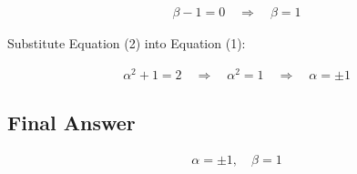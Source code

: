 \documentclass{article}
\begin{document}
\begin{align}
\beta - 1 = 0 \quad \Rightarrow \quad \beta = 1 \tag{2}
\end{align}



Substitute Equation (2) into Equation (1):


\begin{align}
\alpha^2 + 1 = 2 \quad \Rightarrow \quad \alpha^2 = 1 \quad \Rightarrow \quad \alpha = \pm 1
\end{align}



\subsection*{Final Answer}


\begin{align}
\boxed{\alpha = \pm 1, \quad \beta = 1}
\end{align}
\end{document}

